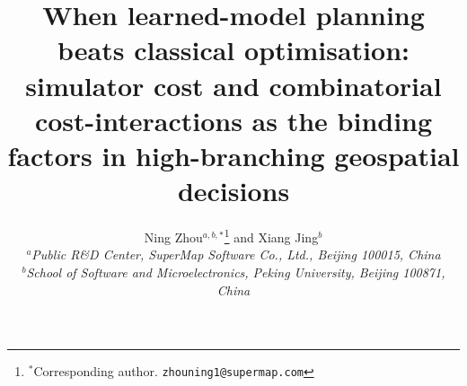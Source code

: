 \documentclass[11pt]{article}
\begin{document}
\title{When learned-model planning beats classical optimisation: simulator cost and combinatorial cost-interactions as the binding factors in high-branching geospatial decisions}

\author{Ning Zhou$^{a,b,\ast}$\thanks{$^\ast$Corresponding author. \texttt{zhouning1@supermap.com}} and Xiang Jing$^{b}$\\
$^{a}${\em Public R\&D Center, SuperMap Software Co., Ltd., Beijing 100015, China}\\
$^{b}${\em School of Software and Microelectronics, Peking University, Beijing 100871, China}}

\date{}
\maketitle
\sloppy  %
\end{document}

